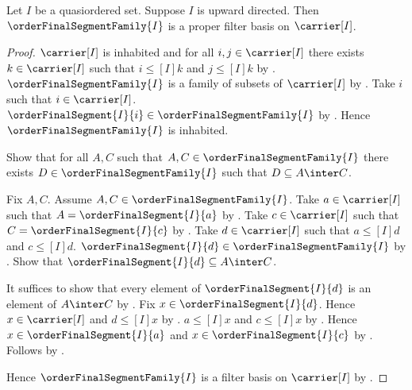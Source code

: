\begin{theorem}\label{upward_directed_final_segments_are_proper_filter_basis}
    Let $I$ be a quasiordered set.
    Suppose $I$ is upward directed.
    Then $\orderFinalSegmentFamily{I}$ is a proper filter basis on
        $\carrier[I]$.
\end{theorem}
\begin{proof}
    $\carrier[I]$ is inhabited and for all
        $i,j\in\carrier[I]$ there exists $k\in\carrier[I]$ such that
        $i\mathrel{\leq[I]}k$ and $j\mathrel{\leq[I]}k$ by
        .
    $\orderFinalSegmentFamily{I}$ is a family of subsets of
        $\carrier[I]$ by .
    Take $i$ such that $i\in\carrier[I]$.
    $\orderFinalSegment{I}{i}\in\orderFinalSegmentFamily{I}$ by
        .
    Hence $\orderFinalSegmentFamily{I}$ is inhabited.

    Show that for all $A,C$ such that
        $A,C\in\orderFinalSegmentFamily{I}$ there exists
        $D\in\orderFinalSegmentFamily{I}$ such that
        $D\subseteq A\inter C$.
    \begin{subproof}
        Fix $A,C$.
        Assume $A,C\in\orderFinalSegmentFamily{I}$.
        Take $a\in\carrier[I]$ such that
            $A=\orderFinalSegment{I}{a}$ by
            .
        Take $c\in\carrier[I]$ such that
            $C=\orderFinalSegment{I}{c}$ by
            .
        Take $d\in\carrier[I]$ such that
            $a\mathrel{\leq[I]}d$ and $c\mathrel{\leq[I]}d$.
        $\orderFinalSegment{I}{d}\in\orderFinalSegmentFamily{I}$ by
            .
        Show that $\orderFinalSegment{I}{d}\subseteq A\inter C$.
        \begin{subproof}
            It suffices to show that every element of
                $\orderFinalSegment{I}{d}$ is an element of $A\inter C$
                by .
            Fix $x\in\orderFinalSegment{I}{d}$.
            Hence $x\in\carrier[I]$ and $d\mathrel{\leq[I]}x$ by
                .
            $a\mathrel{\leq[I]}x$ and $c\mathrel{\leq[I]}x$ by
                .
            Hence $x\in\orderFinalSegment{I}{a}$ and
                $x\in\orderFinalSegment{I}{c}$ by
                .
            Follows by .
        \end{subproof}
    \end{subproof}
    Hence $\orderFinalSegmentFamily{I}$ is a filter basis on
        $\carrier[I]$ by .


\end{proof}
